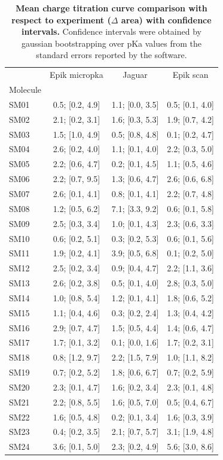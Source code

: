 \documentclass[9pt,lineno,final]{elife}
\begin{document}
\begin{table}[H]
 \caption{{\bf Mean charge titration curve comparison with respect to experiment ($\Delta$ area) with confidence intervals.} Confidence intervals were obtained by gaussian bootstrapping over pKa values from the standard errors reported by the software.}
 \begin{tabular}{lccc}
\toprule
 &    Epik micropka &           Jaguar &        Epik scan \\
Molecule &                  &                  &                  \\
\midrule
SM01     &  0.5; [0.2, 4.9] &  1.1; [0.0, 3.5] &  0.5; [0.1, 4.0] \\
SM02     &  2.1; [0.2, 3.1] &  1.6; [0.3, 5.3] &  1.9; [0.7, 4.2] \\
SM03     &  1.5; [1.0, 4.9] &  0.5; [0.8, 4.8] &  0.1; [0.2, 4.7] \\
SM04     &  2.6; [0.2, 4.0] &  1.1; [0.1, 4.0] &  2.2; [0.3, 5.0] \\
SM05     &  2.2; [0.6, 4.7] &  0.2; [0.1, 4.5] &  1.1; [0.5, 4.6] \\
SM06     &  2.2; [0.7, 9.5] &  1.3; [0.6, 4.7] &  2.6; [0.6, 6.8] \\
SM07     &  2.6; [0.1, 4.1] &  0.8; [0.1, 4.1] &  2.2; [0.7, 4.8] \\
SM08     &  1.2; [0.5, 6.2] &  7.1; [3.3, 9.2] &  0.6; [0.1, 5.8] \\
SM09     &  2.5; [0.3, 3.4] &  1.0; [0.1, 4.3] &  2.3; [0.6, 3.3] \\
SM10     &  0.6; [0.2, 5.1] &  0.3; [0.2, 5.3] &  0.6; [0.1, 5.6] \\
SM11     &  1.9; [0.2, 4.1] &  3.9; [0.5, 6.8] &  0.1; [0.2, 5.0] \\
SM12     &  2.5; [0.2, 3.4] &  0.9; [0.4, 4.7] &  2.2; [1.1, 3.6] \\
SM13     &  2.6; [0.2, 3.8] &  0.5; [0.1, 4.0] &  2.8; [0.3, 5.0] \\
SM14     &  1.0; [0.8, 5.4] &  1.2; [0.1, 4.1] &  1.8; [0.6, 5.2] \\
SM15     &  1.1; [0.4, 4.6] &  0.3; [0.2, 2.4] &  1.3; [0.4, 4.2] \\
SM16     &  2.9; [0.7, 4.7] &  1.5; [0.5, 4.4] &  1.4; [0.6, 4.7] \\
SM17     &  1.7; [0.1, 3.2] &  0.1; [0.0, 1.6] &  1.7; [0.2, 3.1] \\
SM18     &  0.8; [1.2, 9.7] &  2.2; [1.5, 7.9] &  1.0; [1.1, 8.2] \\
SM19     &  0.7; [0.2, 5.2] &  1.8; [0.6, 6.7] &  0.7; [0.2, 5.9] \\
SM20     &  2.3; [0.1, 4.7] &  1.6; [0.2, 3.4] &  2.3; [0.1, 4.8] \\
SM21     &  2.2; [0.8, 5.5] &  1.6; [0.5, 7.0] &  0.5; [0.4, 6.7] \\
SM22     &  1.6; [0.5, 4.8] &  0.2; [0.1, 3.4] &  1.6; [0.3, 3.9] \\
SM23     &  0.4; [0.2, 3.5] &  2.1; [0.7, 5.7] &  3.1; [1.9, 4.8] \\
SM24     &  3.6; [0.1, 5.0] &  2.3; [0.2, 4.9] &  5.6; [3.0, 8.6] \\
\bottomrule
\end{tabular}
 

\end{table}
\end{document}
